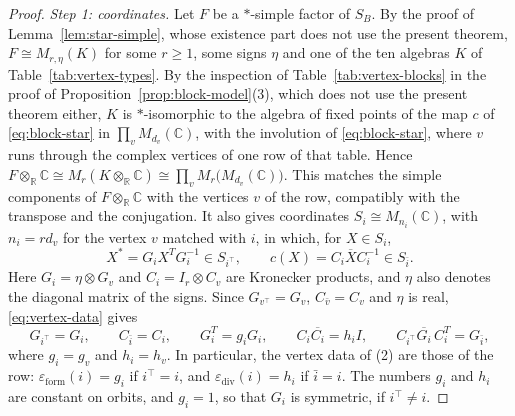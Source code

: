 \documentclass[12pt, a4paper]{report}
\theoremstyle{plain}
\theoremstyle{definition}
\theoremstyle{remark}
\theoremstyle{plain}
\newcommand{\epsilondiv}{\varepsilon_{\mathrm{div}}}
\newcommand{\epsilonform}{\varepsilon_{\mathrm{form}}}
\newcommand{\RR}{\mathbb{R}}
\newcommand{\CC}{\mathbb{C}}
\begin{document}
\begin{proof}
\emph{Step 1: coordinates.} Let $F$ be a $*$-simple factor of $S_B$. By the proof of Lemma~\ref{lem:star-simple}, whose existence part does not use the present theorem, $F\cong M_{r,\eta}(K)$ for some $r\geq1$, some signs $\eta$ and one of the ten algebras $K$ of Table~\ref{tab:vertex-types}. By the inspection of Table~\ref{tab:vertex-blocks} in the proof of Proposition~\ref{prop:block-model}(3), which does not use the present theorem either, $K$ is $*$-isomorphic to the algebra of fixed points of the map $c$ of \eqref{eq:block-star} in $\prod_vM_{d_v}(\CC)$, with the involution of \eqref{eq:block-star}, where $v$ runs through the complex vertices of one row of that table. Hence $F\otimes_\RR\CC\cong M_r(K\otimes_\RR\CC)\cong\prod_vM_r\bigl(M_{d_v}(\CC)\bigr)$. This matches the simple components of $F\otimes_\RR\CC$ with the vertices $v$ of the row, compatibly with the transpose and the conjugation. It also gives coordinates $S_i\cong M_{n_i}(\CC)$, with $n_i=rd_v$ for the vertex $v$ matched with $i$, in which, for $X\in S_i$,
\[ X^*=G_iX^TG_i^{-1}\in S_{i^{\top}},\qquad c(X)=C_i\overline XC_i^{-1}\in S_{\bar i}. \]
Here $G_i=\eta\otimes G_v$ and $C_i=I_r\otimes C_v$ are Kronecker products, and $\eta$ also denotes the diagonal matrix of the signs. Since $G_{v^{\top}}=G_v$, $C_{\bar v}=C_v$ and $\eta$ is real, \eqref{eq:vertex-data} gives
\[ G_{i^{\top}}=G_i,\qquad C_{\bar i}=C_i,\qquad G_i^T=g_iG_i,\qquad C_i\overline{C_i}=h_iI,\qquad C_{i^{\top}}\overline{G_i}\,C_i^T=G_{\bar i}, \]
where $g_i=g_v$ and $h_i=h_v$. In particular, the vertex data of (2) are those of the row: $\epsilonform(i)=g_i$ if $i^{\top}=i$, and $\epsilondiv(i)=h_i$ if $\bar i=i$. The numbers $g_i$ and $h_i$ are constant on orbits, and $g_i=1$, so that $G_i$ is symmetric, if $i^{\top}\neq i$.


\end{proof}
\end{document}
